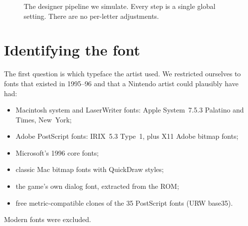 \documentclass[10pt,a4paper]{article}
\begin{document}
\begin{figure}[t]\centering
{}
\caption{The designer pipeline we simulate. Every step is a single global setting. There are no per-letter adjustments.}
\label{fig:pipeline}
\end{figure}

\section{Identifying the font}
\label{sec:font}
The first question is which typeface the artist used. We restricted ourselves to fonts that existed in 1995--96 and that
a Nintendo artist could plausibly have had:
\begin{itemize}
\item Macintosh system and LaserWriter fonts: Apple System~7.5.3 Palatino and Times, New~York;
\item Adobe PostScript fonts: IRIX~5.3 Type~1, plus X11 Adobe bitmap fonts;
\item Microsoft's 1996 core fonts;
\item classic Mac bitmap fonts with QuickDraw styles;
\item the game's own dialog font, extracted from the ROM;
\item free metric-compatible clones of the 35 PostScript fonts (URW base35).
\end{itemize}
Modern fonts were excluded.
\end{document}
